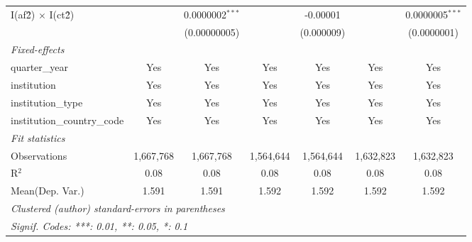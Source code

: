 \begin{tabular}{lcccccc}
   I(af\^2) $\times$ I(ct\^2)         &               & 0.0000002$^{***}$ &               & -0.00001        &               & 0.0000005$^{***}$\\   
                                      &               & (0.00000005)      &               & (0.000009)      &               & (0.0000001)\\   
   \midrule
   \emph{Fixed-effects}\\
   quarter\_year                      & Yes           & Yes               & Yes           & Yes             & Yes           & Yes\\  
   institution                        & Yes           & Yes               & Yes           & Yes             & Yes           & Yes\\  
   institution\_type                  & Yes           & Yes               & Yes           & Yes             & Yes           & Yes\\  
   institution\_country\_code         & Yes           & Yes               & Yes           & Yes             & Yes           & Yes\\  
   \midrule
   \emph{Fit statistics}\\
   Observations                       & 1,667,768     & 1,667,768         & 1,564,644     & 1,564,644       & 1,632,823     & 1,632,823\\  
   R$^2$                              & 0.08          & 0.08              & 0.08          & 0.08            & 0.08          & 0.08\\  
Mean(Dep. Var.) & 1.591 & 1.591 & 1.592 & 1.592 & 1.592 & 1.592 \\
   \midrule \midrule
   \multicolumn{7}{l}{\emph{Clustered (author) standard-errors in parentheses}}\\
   \multicolumn{7}{l}{\emph{Signif. Codes: ***: 0.01, **: 0.05, *: 0.1}}\\
\end{tabular}
\par\endgroup

